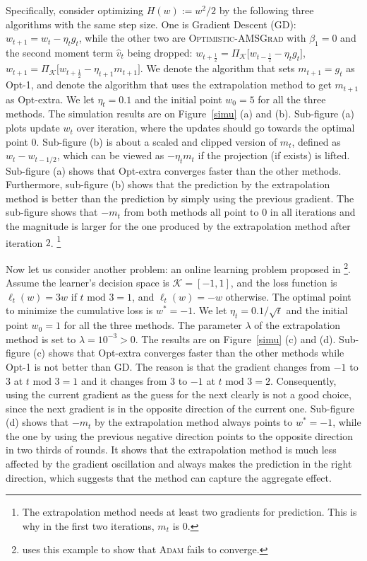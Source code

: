 \documentclass[11pt]{article}
\def\K{\mathcal{K}}
\theoremstyle{k}
\begin{document}
Specifically, consider optimizing $H(w) := w^2/2 $ 
by the following three algorithms with the same step size.
One is Gradient Descent (GD): $w_{t+1} = w_t - \eta_t g_t$,
while the other two are
\textsc{Optimistic-AMSGrad} with $\beta_1=0$ and the second moment term $\hat{v}_t$ being dropped: 
$w_{t+\frac{1}{2}} = \Pi_{\K}\big[ w_{t-\frac{1}{2}} - \eta_t g_t \big]$,
$w_{t+1} = \Pi_{\K}\big[ w_{t+\frac{1}{2}} - \eta_{t+1} m_{t+1} \big]$.
We denote the algorithm that sets $m_{t+1}= g_t$ as Opt-1,
and denote the algorithm that uses the extrapolation method
to get $m_{t+1}$ as Opt-extra.
We let $\eta_t=0.1$ and the initial point $w_0=5$ for all the three methods. 
The simulation results are on Figure~\ref{simu} (a) and (b). Sub-figure (a) plots update $w_t$ over iteration, where the updates should go towards the optimal point $0$.
Sub-figure (b) is about a scaled and clipped version of $m_t$, defined as $w_t - w_{t-1/2}$,
which can be viewed as $- \eta_t m_{t}$ if the projection (if exists) is lifted.
Sub-figure (a) shows that Opt-extra converges faster than the other methods. 
Furthermore, sub-figure (b) shows that the prediction by the extrapolation
method is better than the prediction by simply using the previous gradient. The sub-figure shows that
$-m_t$ from both methods all point to $0$ in all iterations and the magnitude is larger for the one produced by the extrapolation method after iteration $2$. \footnote{
The extrapolation method needs at least two gradients for prediction.
This is why in the first two iterations, $m_t$ is $0$.
}


Now let us consider another problem: an online learning problem proposed in \cite{RKK18}
\footnote{\cite{RKK18} uses this example to show that \textsc{Adam} \cite{KB15} fails to converge.}.
Assume the learner's decision space is $\K=[-1,1]$, and
the loss function is $\ell_t(w) = 3 w$ if $t \text{ mod } 3 = 1$,
and $\ell_t(w) = - w$ otherwise.
The optimal point to minimize the cumulative loss is $w^*=-1$.
We let $\eta_t=0.1 / \sqrt{t}$ and the initial point $w_0=1$ for all the three methods.
The parameter $\lambda$ of the extrapolation method is set to $\lambda=10^{-3}>0$.
The results are on Figure~\ref{simu} (c) and (d).
Sub-figure (c) shows that Opt-extra converges faster than the other methods
while Opt-1 is not better than GD.
The reason is that the gradient changes from $-1$ to $3$ at $t \text{ mod } 3 = 1$
and it changes from $3$ to $-1$ at $t \text{ mod } 3 = 2$.
Consequently, using the current gradient as the guess for the next clearly is not a good choice,
since the next gradient is in the opposite direction of the current one.
Sub-figure (d) shows that $-m_t$ by the extrapolation method always points to
$w^*=-1$, while the one by using the previous negative direction points to the opposite direction in two thirds of rounds. It shows that the extrapolation method is much less affected by the gradient oscillation and always makes the prediction in the right direction, which suggests that the method can capture the aggregate effect.
\end{document}

